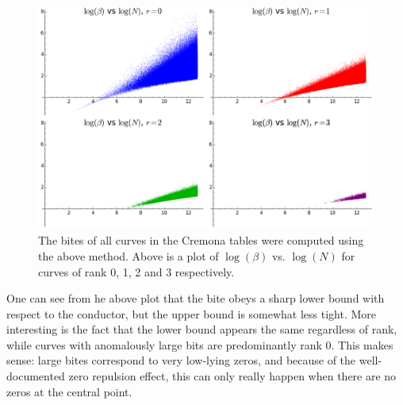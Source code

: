 \begin{figure}[!h]
    \centering
    \includegraphics[width=1.0\textwidth]{graphics/bites_vs_conductors_array.png}
    \caption{The bites of all curves in the Cremona tables were computed using the above method. Above is a plot of $\log(\beta)$ vs. $\log(N)$ for curves of rank 0, 1, 2 and 3 respectively. }
    \label{fig:bites_vs_conductors_array}
\end{figure}

One can see from he above plot that the bite obeys a sharp lower bound with respect to the conductor, but the upper bound is somewhat less tight. More interesting is the fact that the lower bound appears the same regardless of rank, while curves with anomalously large bits are predominantly rank $0$. This makes sense: large bites correspond to very low-lying zeros, and because of the well-documented zero repulsion effect, this can only really happen when there are no zeros at the central point. \\


